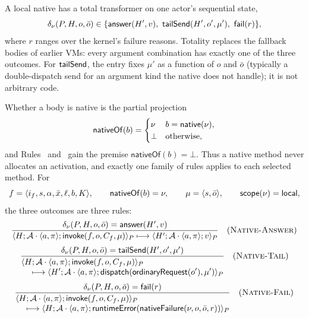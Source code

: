 A local native has a total transformer on one actor's sequential state,
\begin{equation}\label{eq:native-outcome}
 \delta_\nu(P,H,o,\bar o)\in\{
   \mathsf{answer}(H',v),\
   \mathsf{tailSend}(H',o',\mu'),\
   \mathsf{fail}(r)\},
\end{equation}
where $r$ ranges over the kernel's failure reasons.  Totality replaces the
fallback bodies of earlier VMs: every argument combination has exactly one of
the three outcomes.  For $\mathsf{tailSend}$, the entry fixes $\mu'$ as a function
of $o$ and $\bar o$ (typically a double-dispatch send for an argument kind the
native does not handle); it is not arbitrary code.

Whether a body is native is the partial projection
\begin{equation}\label{eq:native-invoke-restriction}
 \mathsf{nativeOf}(b)=
 \begin{cases}
  \nu & b=\mathsf{native}(\nu),\\
  \bot & \text{otherwise,}
 \end{cases}
\end{equation}
and Rules~ and~ gain the
premise $\mathsf{nativeOf}(b)=\bot$.
Thus a native method never allocates an activation, and exactly one family of
rules applies to each selected method.  For
\[f=\langle i_f,s,\alpha,\bar x,\ell,b,K\rangle,
 \qquad\mathsf{nativeOf}(b)=\nu,
 \qquad\mu=\langle s,\bar o\rangle,
 \qquad\mathsf{scope}(\nu)=\mathsf{local},\]
the three outcomes are three rules:
\[
\dfrac{\delta_\nu(P,H,o,\bar o)=\mathsf{answer}(H',v)}
 {\langle H;\mathcal A\cdot\langle a,\pi\rangle;
      \mathsf{invoke}(f,o,C_f,\mu)\rangle_P
  \longmapsto
  \langle H';\mathcal A\cdot\langle a,\pi\rangle;v\rangle_P}
\quad(\textsc{Native-Answer})
\]
\[
\dfrac{\delta_\nu(P,H,o,\bar o)=\mathsf{tailSend}(H',o',\mu')}
 {\begin{aligned}
  &\langle H;\mathcal A\cdot\langle a,\pi\rangle;
      \mathsf{invoke}(f,o,C_f,\mu)\rangle_P\\[-1mm]
  &\quad\longmapsto
  \langle H';\mathcal A\cdot\langle a,\pi\rangle;
      \mathsf{dispatch}(\mathsf{ordinaryRequest}(o'),\mu')\rangle_P
 \end{aligned}}
\quad(\textsc{Native-Tail})
\]
\[
\dfrac{\delta_\nu(P,H,o,\bar o)=\mathsf{fail}(r)}
 {\begin{aligned}
  &\langle H;\mathcal A\cdot\langle a,\pi\rangle;
      \mathsf{invoke}(f,o,C_f,\mu)\rangle_P\\[-1mm]
  &\quad\longmapsto
  \langle H;\mathcal A\cdot\langle a,\pi\rangle;
      \mathsf{runtimeError}(\mathsf{nativeFailure}(\nu,o,\bar o,r))\rangle_P
 \end{aligned}}
\quad(\textsc{Native-Fail})
\]
